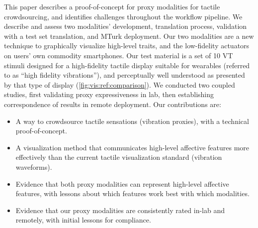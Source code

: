       
          
      
    This paper describes a proof-of-concept for  proxy modalities for tactile crowdsourcing, and identifies  challenges throughout the workflow pipeline. 
    We describe and assess 
    two modalities' development,  translation process, validation with a test set translation, and MTurk deployment.  
    Our two modalities are a new  technique to graphically visualize high-level traits, and the low-fidelity actuators on users' own commodity smartphones. 
    Our test material is a set of 10 VT stimuli designed for a high-fidelity tactile display suitable for wearables (referred to as ``high fidelity vibrations''), and perceptually well understood as presented by that type of display  (\autoref{fig:vis:ref:comparison}).  
    We conducted two coupled studies, first validating proxy expressiveness in  lab, then establishing correspondence of results in remote deployment.
%
    Our contributions are:
    \begin{itemize}
    \setlength\itemsep{0px}
        \item  A way to crowdsource tactile sensations (vibration proxies), with a technical proof-of-concept.
        \item A visualization method that communicates high-level affective features more effectively than the current tactile visualization standard (vibration waveforms).
        \item Evidence that both proxy modalities can represent high-level affective features, with lessons about which features work best with which modalities.
        \item Evidence that our proxy modalities are consistently rated in-lab and remotely, with initial lessons for compliance.  
    \end{itemize}
 


